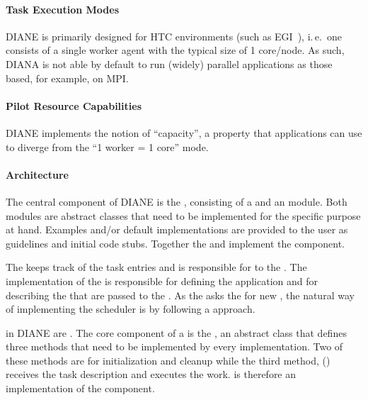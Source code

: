 \documentclass{sig-alternate}
\begin{document}
\paragraph{Task Execution Modes}
DIANE is primarily designed for HTC environments (such as EGI~\cite{egi}),
i.\,e.\ one \pilot consists of a single worker agent with the typical size of 1
core/node. As such, DIANA is not able by default to run (widely) parallel
applications as those based, for example, on MPI.

\paragraph{Pilot Resource Capabilities}
DIANE implements the notion of  ``capacity'', a property that
applications can use to diverge from the ``1 worker = 1 core''
mode.

\paragraph{Architecture}
The central component of DIANE is the , consisting of a
 and an  module. Both
modules are abstract classes that need to be implemented for the specific
purpose at hand. Examples and/or default implementations are provided to the
user as guidelines and initial code stubs. Together the 
and  implement the 
component.

The  keeps track of the task entries and is responsible
for  to the . The
implementation of the  is responsible for defining
the application  and for describing the  that are
passed to the . As the  asks
the  for new , the natural way of
implementing the scheduler is by following a  approach.

\vocab{\pilots} in DIANE are . The core component of a
 is the , an abstract class
that defines three methods that need to be implemented by every implementation.
Two of these methods are for initialization and cleanup while the third method,
() receives the task description and executes the work.
 is therefore an implementation of the
 component.
\end{document}
